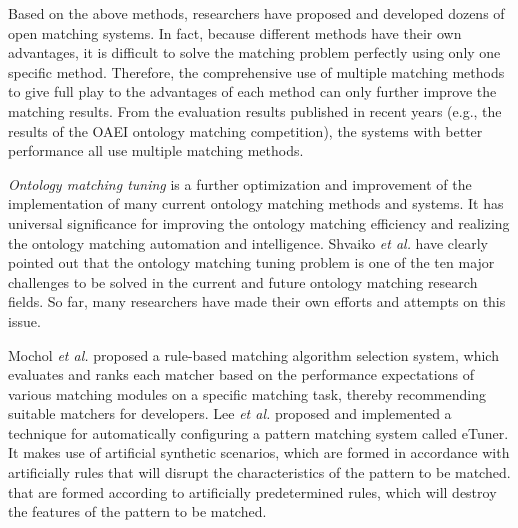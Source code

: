 \documentclass[twoside]{article}
\makeatletter
\def\subsection{\@startsection{subsection}{2}{\z@}%
 {-3ex\@plus -.2ex \@minus -.2ex}%
 {2ex \@plus.2ex}%
{\normalfont\normalsize\protect\baselineskip=12.5pt plus.2pt minus.2pt\bfseries}}
\makeatother
\begin{document}
Based on the above methods, researchers have proposed and developed dozens of open matching systems. In fact, because different methods have their own advantages, it is difficult to solve the matching problem perfectly using only one specific method. Therefore, the comprehensive use of multiple matching methods to give full play to the advantages of each method can only further improve the matching results. From the evaluation results published in recent years (e.g., the results of the OAEI ontology matching competition), the systems with better performance all use multiple matching methods\cite{wwy31,wwy32,wwy33,wwy34}.

{\it Ontology matching tuning} is a further optimization and improvement of the implementation of many current ontology matching methods and systems.
It has universal significance for improving the ontology matching efficiency and realizing the ontology matching automation and intelligence.
Shvaiko {\it et al.} have clearly pointed out that the ontology matching tuning problem is one of the ten major challenges to be solved in the current and future ontology matching research fields\cite{wwy18,wwy35}.
So far, many researchers have made their own efforts and attempts on this issue.

Mochol {\it et al.} proposed a rule-based matching algorithm selection system\cite{wwy36}, which evaluates and ranks each matcher based on the performance expectations of various matching modules on a specific matching task, thereby recommending suitable matchers for developers.
Lee {\it et al.} proposed and implemented a technique for automatically configuring a pattern matching system called eTuner\cite{wwy38}. It makes use of artificial synthetic scenarios, which are formed in accordance with artificially rules that will disrupt the characteristics of the pattern to be matched.
 that are formed according to artificially predetermined rules, which will destroy the features of the pattern to be matched.
\end{document}
